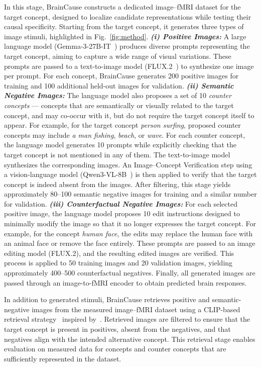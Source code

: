 \documentclass{article}
\begin{document}
In this stage, BrainCause constructs a dedicated image--fMRI dataset for the target concept, designed to localize candidate representations while testing their causal specificity. Starting from the target concept, it generates three types of image stimuli, highlighted in Fig.~\ref{fig:method}. \emph{\textbf{(i) Positive Images:}} A large language model (Gemma-3-27B-IT~\cite{gemma_2025}) produces diverse prompts representing the target concept, aiming to capture a wide range of visual variations. These prompts are passed to a text-to-image model (FLUX.2~\cite{flux-2-2025}) to synthesize one image per prompt. For each concept, BrainCause generates 200 positive images for training and 100 additional held-out images for validation. \emph{\textbf{(ii) Semantic Negative Images:}} The language model also proposes a set of 10 \emph{counter concepts} --- concepts that are semantically or visually related to the target concept, and may co-occur with it, but do not require the target concept itself to appear. For example, for the target concept \emph{person surfing}, proposed counter concepts may include \emph{a man fishing}, \emph{beach}, or \emph{wave}. For each counter concept, the language model generates 10 prompts while explicitly checking that the target concept is not mentioned in any of them. The text-to-image model synthesizes the corresponding images. An Image--Concept Verification step using a vision-language model (Qwen3-VL-8B~\cite{qwen3technicalreport}) is then applied to verify that the target concept is indeed absent from the images. After filtering, this stage yields approximately 80--100 semantic negative images for training and a similar number for validation. \emph{\textbf{(iii) Counterfactual Negative Images:}} For each selected positive image, the language model proposes 10 edit instructions designed to minimally modify the image so that it no longer expresses the target concept. For example, for the concept \emph{human face}, the edits may replace the human face with an animal face or remove the face entirely. These prompts are passed to an image editing model (FLUX.2), and the resulting edited images are verified. This process is applied to 50 training images and 20 validation images, yielding approximately 400--500 counterfactual negatives. Finally, all generated images are passed through an image-to-fMRI encoder to obtain predicted brain responses.

In addition to generated stimuli, BrainCause retrieves positive and semantic-negative images from the measured image--fMRI dataset using a CLIP-based retrieval strategy~\cite{radford2021learning} inspired by~\cite{Bao2025MindSimulator}. Retrieved images are filtered to ensure that the target concept is present in positives, absent from the negatives, and that negatives align with the intended alternative concept. This retrieval stage enables evaluation on measured data for concepts and counter concepts that are sufficiently represented in the dataset. 
\end{document}
